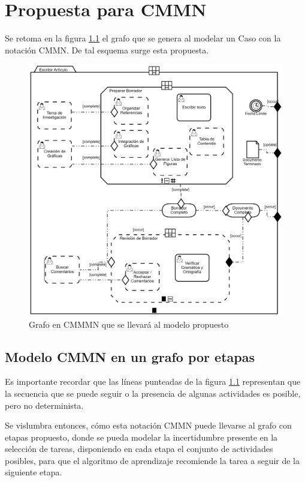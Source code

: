 \chapter{Propuesta para CMMN}
\label{aplica}

Se retoma en la figura \ref{CMMN_modelo_prueba} el grafo que se genera al modelar un Caso con la notación CMMN. De tal esquema surge esta propuesta.

\begin{figure} [h]
  \centering
    \includegraphics[scale=0.25]{ModeloCMM.png}
  \caption[Modelo CMMN]{Grafo en CMMMN que se llevará al modelo propuesto}
  \label{CMMN_modelo_prueba}
\end{figure}


\section{Modelo CMMN en un grafo por etapas}

Es importante recordar que las líneas punteadas de la figura \ref{CMMN_modelo_prueba} representan que la secuencia que se puede seguir o la presencia de algunas actividades es posible, pero no determinista.

Se vislumbra entonces, cómo esta notación CMMN puede llevarse al grafo con etapas propuesto, donde se pueda modelar la incertidumbre presente en la selección de tareas, disponiendo en cada etapa el conjunto de actividades posibles, para que el algoritmo de aprendizaje recomiende la tarea a seguir de la siguiente etapa.

